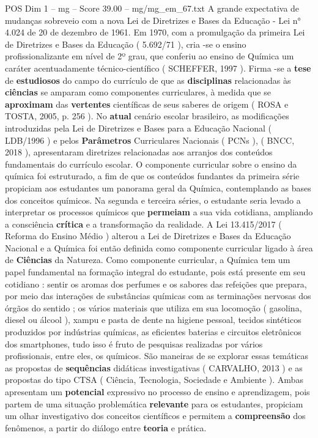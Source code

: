 \begin{textsample}{POS Dim 1 – mg – Score 39.00 – mg/mg\_em\_67.txt}
A grande expectativa de mudanças sobreveio com a nova Lei de Diretrizes e Bases da Educação - Lei n{\EmojiFont °} 4.024 de 20 de dezembro de 1961.
Em 1970, com a promulgação da primeira Lei de Diretrizes e Bases da Educação ( 5.692/71 ), cria -se o ensino profissionalizante em nível de 2º grau, que conferiu ao ensino de Química um caráter acentuadamente técnico-científico ( SCHEFFER, 1997 ).
Firma -se a \textbf{tese} de \textbf{estudiosos} do campo do currículo de que as \textbf{disciplinas} relacionadas às \textbf{ciências} se amparam como componentes curriculares, à medida que se \textbf{aproximam} das \textbf{vertentes} científicas de seus saberes de origem ( ROSA e TOSTA, 2005, p. 256 ).
No \textbf{atual} cenário escolar brasileiro, as modificações introduzidas pela Lei de Diretrizes e Bases para a Educação Nacional ( LDB/1996 ) e pelos \textbf{Parâmetros} Curriculares Nacionais ( PCNs ), ( BNCC, 2018 ), apresentaram diretrizes relacionadas aos arranjos dos conteúdos fundamentais do currículo escolar.
O componente curricular sobre o ensino da química foi estruturado, a fim de que os conteúdos fundantes da primeira série propiciam aos estudantes um panorama geral da Química, contemplando as bases dos conceitos químicos.
Na segunda e terceira séries, o estudante seria levado a interpretar os processos químicos que \textbf{permeiam} a sua vida cotidiana, ampliando a consciência \textbf{crítica} e a transformação da realidade.
A Lei 13.415/2017 ( Reforma do Ensino Médio ) alterou a Lei de Diretrizes e Bases da Educação Nacional e a Química foi então definida como componente curricular ligado à área de \textbf{Ciências} da Natureza.
Como componente curricular, a Química tem um papel fundamental na formação integral do estudante, pois está presente em seu cotidiano : sentir os aromas dos perfumes e os sabores das refeições que prepara, por meio das interações de substâncias químicas com as terminações nervosas dos órgãos do sentido ; os vários materiais que utiliza em sua locomoção ( gasolina, diesel ou álcool ), xampu e pasta de dente na higiene pessoal, tecidos sintéticos produzidos por indústrias químicas, as eficientes baterias e circuitos eletrônicos dos smartphones, tudo isso é fruto de pesquisas realizadas por vários profissionais, entre eles, os químicos.
São maneiras de se explorar essas temáticas as propostas de \textbf{sequências} didáticas investigativas ( CARVALHO, 2013 ) e as propostas do tipo CTSA ( Ciência, Tecnologia, Sociedade e Ambiente ).
Ambas apresentam um \textbf{potencial} expressivo no processo de ensino e aprendizagem, pois partem de uma situação problemática \textbf{relevante} para os estudantes, propiciam um olhar investigativo dos conceitos científicos e permitem a \textbf{compreensão} dos fenômenos, a partir do diálogo entre \textbf{teoria} e prática.

\end{textsample}
